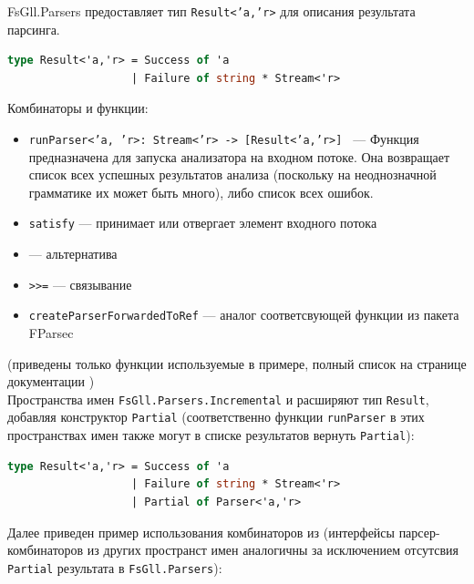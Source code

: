 \documentclass[14pt]{matmex-diploma}
\begin{document}
FsGll.Parsers предоставляет тип {\tt Result<'a,'r>} для описания результата парсинга.
\begin{lstlisting}[language=FSharp]
type Result<'a,'r> = Success of 'a
    	           | Failure of string * Stream<'r>
\end{lstlisting}

Комбинаторы и функции:
\begin{itemize}
    \item {\tt runParser<'a, 'r>: Stream<'r> -> [Result<'a,'r>] } --- Функция  предназначена для запуска анализатора на входном потоке. Она возвращает список всех успешных результатов анализа (поскольку на неоднозначной грамматике их может быть много), либо список всех ошибок.
    \item {\tt satisfy} --- принимает или отвергает элемент входного потока 
    \item {\tt <|>} --- альтернатива
    \item {\tt >>=} --- связывание
    \item {\tt createParserForwardedToRef} --- аналог соответсвующей функции из пакета FParsec 
        \cite{fparsec:createpforwtoref}
\end{itemize}
(приведены только функции используемые в примере, полный список на странице документации \cite{fsglldoc})\\

Пространства имен {\tt FsGll.Parsers.Incremental} и  
расширяют тип {\tt Result}, добавляя конструктор {\tt Partial} 
(соответственно функции {\tt runParser} в этих пространствах имен также могут 
в списке результатов вернуть {\tt Partial}):

\begin{lstlisting}[language=FSharp]
type Result<'a,'r> = Success of 'a
    	           | Failure of string * Stream<'r>
                   | Partial of Parser<'a,'r>
\end{lstlisting}

Далее приведен пример использования комбинаторов из  
(интерфейсы парсер-комбинаторов из других пространст имен аналогичны за исключением
отсутсвия {\tt Partial} результата в {\tt FsGll.Parsers}):
\end{document}

